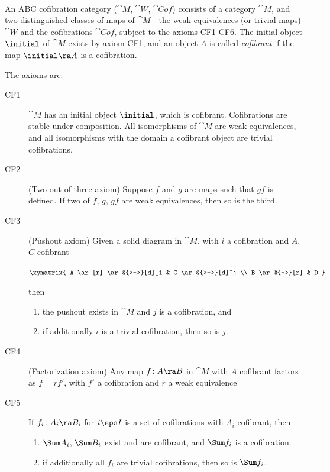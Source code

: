 \begin{defn}
\label{defn:cofcat}
\mbox{} \\
An ABC cofibration category (${\cat M}$, ${\cat W}$, ${\cat Cof}$) consists of a category ${\cat M}$, and two distinguished classes of maps of ${\cat M}$ - the weak equivalences (or trivial maps) ${\cat W}$ and the cofibrations ${\cat Cof}$, subject to the axioms CF1-CF6. The initial object $\initial$ of ${\cat M}$ exists by axiom CF1, and an object $A$ is called {\it cofibrant} if the map $\initial \ra A$ is a cofibration.

The axioms are:
\begin{description}
\item[CF1]
${\cat M}$ has an initial object $\initial$, which is cofibrant. Cofibrations are stable under composition. All isomorphisms of ${\cat M}$ are weak equivalences, and all isomorphisms with the domain a cofibrant object are trivial cofibrations. 

\item[CF2]
(Two out of three axiom) Suppose $f$ and $g$ are maps such that $gf$ is defined. If two of $f$, $g$, $gf$ are weak equivalences, then so is the third.

\item[CF3]
(Pushout axiom) Given a solid diagram in ${\cat M}$, with $i$ a cofibration and  $A$, $C$ cofibrant
\begin{center}
$ \xymatrix {
	A \ar[r] \ar@{>->}[d]_i &
	C \ar@{>-->}[d]^j \\
	B \ar@{-->}[r] &
	D
	}$
\end{center}
then
\begin{enumerate}
\item
the pushout exists in ${\cat M}$ and $j$ is a cofibration, and
\item
if additionally $i$ is a trivial cofibration, then so is $j$.
\end{enumerate}

\item[CF4]
(Factorization axiom) Any map $f \colon A \ra B$ in ${\cat M}$ with $A$ cofibrant factors as $f = rf'$, with $f'$ a cofibration and $r$  a weak equivalence

\item[CF5]
If $f_i \colon A_i \ra B_i$ for $i \eps I$ is a set of cofibrations with $A_i$ cofibrant, then
\begin{enumerate}
\item
$\Sum A_i$, $\Sum B_i$ exist and are cofibrant, and $\Sum f_i$ is a cofibration.
\item
if additionally all $f_i$ are trivial cofibrations, then so is $\Sum f_i$.
\end{enumerate}


\end{description}
\end{defn}
